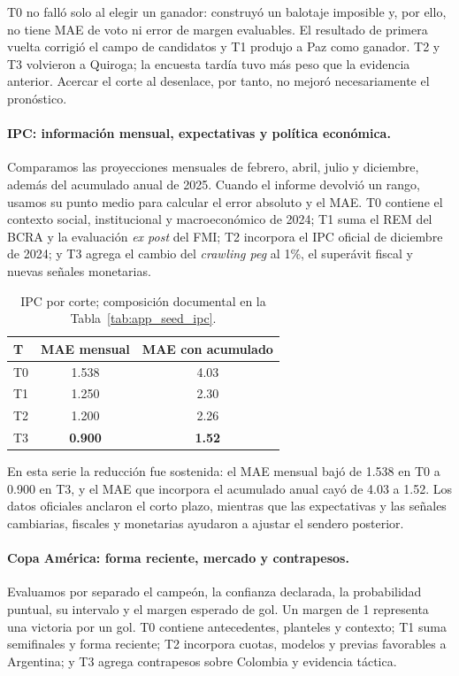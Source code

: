 \documentclass[11pt]{article}
\begin{document}
T0 no falló solo al elegir un ganador: construyó un balotaje imposible y, por ello, no tiene MAE de voto ni error de margen evaluables. El resultado de primera vuelta corrigió el campo de candidatos y T1 produjo a Paz como ganador. T2 y T3 volvieron a Quiroga; la encuesta tardía tuvo más peso que la evidencia anterior. Acercar el corte al desenlace, por tanto, no mejoró necesariamente el pronóstico.

\paragraph{IPC: información mensual, expectativas y política económica.}
Comparamos las proyecciones mensuales de febrero, abril, julio y diciembre, además del acumulado anual de 2025. Cuando el informe devolvió un rango, usamos su punto medio para calcular el error absoluto y el MAE. T0 contiene el contexto social, institucional y macroeconómico de 2024; T1 suma el REM del BCRA y la evaluación \textit{ex post} del FMI; T2 incorpora el IPC oficial de diciembre de 2024; y T3 agrega el cambio del \textit{crawling peg} al 1\%, el superávit fiscal y nuevas señales monetarias.

\begin{table}[H]
\centering
\small
\begin{tabular}{@{}lcc@{}}
\toprule
\textbf{T} & \textbf{MAE mensual} & \textbf{MAE con acumulado} \\
\midrule
T0 & 1.538 & 4.03 \\
T1 & 1.250 & 2.30 \\
T2 & 1.200 & 2.26 \\
T3 & \textbf{0.900} & \textbf{1.52} \\
\bottomrule
\end{tabular}
\caption{IPC por corte; composición documental en la Tabla~\ref{tab:app_seed_ipc}.}
\label{tab:seed_ipc}
\end{table}

En esta serie la reducción fue sostenida: el MAE mensual bajó de 1.538 en T0 a 0.900 en T3, y el MAE que incorpora el acumulado anual cayó de 4.03 a 1.52. Los datos oficiales anclaron el corto plazo, mientras que las expectativas y las señales cambiarias, fiscales y monetarias ayudaron a ajustar el sendero posterior.

\paragraph{Copa América: forma reciente, mercado y contrapesos.}
Evaluamos por separado el campeón, la confianza declarada, la probabilidad puntual, su intervalo y el margen esperado de gol. Un margen de 1 representa una victoria por un gol. T0 contiene antecedentes, planteles y contexto; T1 suma semifinales y forma reciente; T2 incorpora cuotas, modelos y previas favorables a Argentina; y T3 agrega contrapesos sobre Colombia y evidencia táctica.
\end{document}
